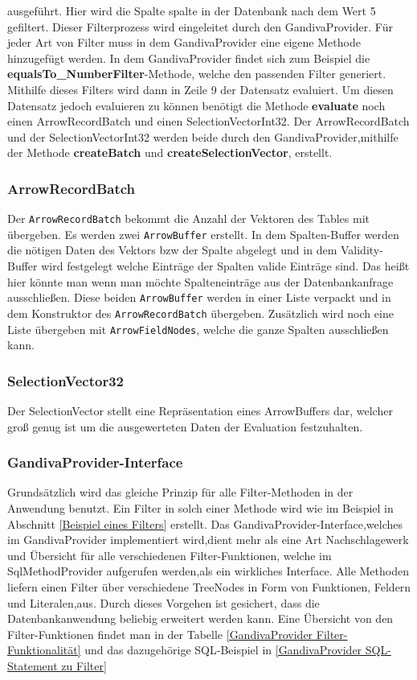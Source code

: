 ausgeführt. Hier wird die Spalte spalte in der Datenbank nach dem Wert 5 gefiltert. Dieser Filterprozess wird eingeleitet durch den GandivaProvider.
Für jeder Art von Filter muss in dem GandivaProvider eine eigene Methode hinzugefügt werden. In dem GandivaProvider findet sich zum Beispiel die \textbf{equalsTo\_NumberFilter}-Methode, welche den passenden Filter generiert.
Mithilfe dieses Filters wird dann in Zeile 9 der Datensatz evaluiert. Um diesen Datensatz jedoch evaluieren zu können benötigt die Methode \textbf{evaluate} noch einen ArrowRecordBatch und einen SelectionVectorInt32.
Der ArrowRecordBatch und der SelectionVectorInt32 werden beide durch den GandivaProvider,mithilfe der Methode \textbf{createBatch} und \textbf{createSelectionVector}, erstellt.


\subsubsection{ArrowRecordBatch}

Der \texttt{ArrowRecordBatch} bekommt die Anzahl der Vektoren des Tables mit übergeben.
Es werden zwei \texttt{ArrowBuffer} erstellt. In dem Spalten-Buffer werden die nötigen Daten des Vektors bzw der Spalte abgelegt und in dem Validity-Buffer wird festgelegt welche Einträge der Spalten valide Einträge sind. Das heißt hier könnte man wenn man möchte Spalteneinträge aus der Datenbankanfrage ausschließen.
Diese beiden \texttt{ArrowBuffer} werden in einer Liste verpackt und in dem Konstruktor des \texttt{ArrowRecordBatch} übergeben. Zusätzlich wird noch eine Liste übergeben mit \texttt{ArrowFieldNodes}, welche die ganze Spalten ausschließen kann.

\subsubsection{SelectionVector32}

Der SelectionVector stellt eine Repräsentation eines ArrowBuffers dar, welcher groß genug ist um die ausgewerteten Daten der Evaluation festzuhalten.


\subsubsection{GandivaProvider-Interface}
Grundsätzlich wird das gleiche Prinzip für alle Filter-Methoden in der Anwendung benutzt. Ein Filter in solch einer Methode wird wie im Beispiel in Abschnitt \ref{Beispiel eines Filters} erstellt. Das GandivaProvider-Interface,welches im GandivaProvider implementiert wird,dient mehr als eine Art Nachschlagewerk und Übersicht für alle verschiedenen Filter-Funktionen, welche im SqlMethodProvider aufgerufen werden,als ein wirkliches Interface.
Alle Methoden liefern einen Filter über verschiedene TreeNodes in Form von Funktionen, Feldern und Literalen,aus. Durch dieses Vorgehen ist gesichert, dass die Datenbankanwendung beliebig erweitert werden kann.
Eine Übersicht von den Filter-Funktionen findet man in der Tabelle \ref{GandivaProvider Filter-Funktionalität} und das dazugehörige SQL-Beispiel in \ref{GandivaProvider SQL-Statement zu Filter}

